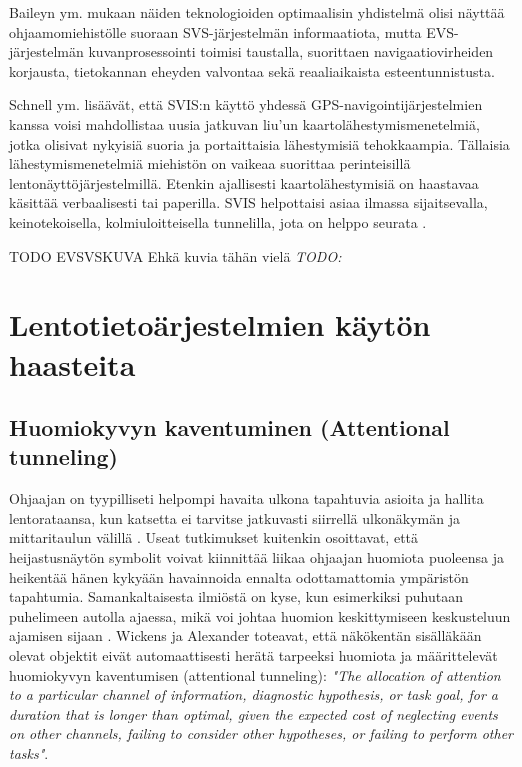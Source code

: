 \documentclass[utf8,bachelor,manualbib]{gradu3}
\begin{document}
Baileyn ym.\citeyearpar{baileyym2007} mukaan näiden teknologioiden optimaalisin yhdistelmä olisi näyttää ohjaamomiehistölle suoraan SVS-järjestelmän informaatiota, mutta EVS-järjestelmän kuvanprosessointi toimisi taustalla, suorittaen navigaatiovirheiden korjausta, tietokannan eheyden valvontaa sekä reaaliaikaista esteentunnistusta.

Schnell ym. \citeyearpar{schnellym2004} lisäävät, että SVIS:n käyttö yhdessä GPS-navigointijärjestelmien kanssa voisi mahdollistaa uusia jatkuvan liu'un kaartolähestymismenetelmiä, jotka olisivat nykyisiä suoria ja portaittaisia lähestymisiä tehokkaampia. Tällaisia lähestymismenetelmiä miehistön on vaikeaa suorittaa perinteisillä lentonäyttöjärjestelmillä. Etenkin ajallisesti kaartolähestymisiä on haastavaa käsittää verbaalisesti tai paperilla. SVIS helpottaisi asiaa ilmassa sijaitsevalla, keinotekoisella, kolmiuloitteisella tunnelilla, jota on helppo seurata \citep{barrowspowell1999}.

TODO EVSVSKUVA Ehkä kuvia tähän vielä \citep{schnellym2004} \emph{TODO:}

\chapter{Lentotietoärjestelmien käytön haasteita}

\section{Huomiokyvyn kaventuminen (Attentional tunneling)}

Ohjaajan on tyypilliseti helpompi havaita ulkona tapahtuvia asioita ja hallita lentorataansa, kun katsetta ei tarvitse jatkuvasti siirrellä ulkonäkymän ja mittaritaulun välillä \citep{crawfordneal2006, ververswickens1998}. Useat tutkimukset \citep{fischerym1980, kimkaber2014, weintraubensing1992, wickenslong1995, wickensalexander2009} kuitenkin osoittavat, että heijastusnäytön symbolit voivat kiinnittää liikaa ohjaajan huomiota puoleensa ja heikentää hänen kykyään havainnoida ennalta odottamattomia ympäristön tapahtumia. Samankaltaisesta ilmiöstä on kyse, kun esimerkiksi puhutaan puhelimeen autolla ajaessa, mikä voi johtaa huomion keskittymiseen keskusteluun ajamisen sijaan \citep{horreywickens2006, strayerdrews2007, strayerym2001}. Wickens ja Alexander \citeyearpar{wickensalexander2009} toteavat, että näkökentän sisälläkään olevat objektit eivät automaattisesti herätä tarpeeksi huomiota ja määrittelevät huomiokyvyn kaventumisen (attentional tunneling): \emph{"The allocation of attention to a particular channel of information, diagnostic hypothesis, or task goal, for a duration that is longer than optimal, given the expected cost of neglecting events on other channels, failing to consider other hypotheses, or failing to perform other tasks"}.
\end{document}
